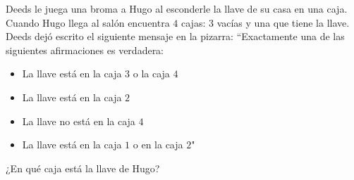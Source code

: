 Deeds le juega una broma a Hugo al esconderle la llave de su casa en una caja. Cuando Hugo llega al salón encuentra $4$ cajas: $3$ vacías y una que tiene la llave. Deeds dejó escrito el siguiente mensaje en la pizarra: “Exactamente una de las siguientes afirmaciones es verdadera:
 \begin{itemize} 
 \item  La llave está en la caja $3$ o la caja $4$ 
 \item  La llave está en la caja $2$ 
 \item  La llave no está en la caja $4$ 
 \item  La llave está en la caja $1$ o en la caja $2$" 
 \end{itemize} 
¿En qué caja está la llave de Hugo?
